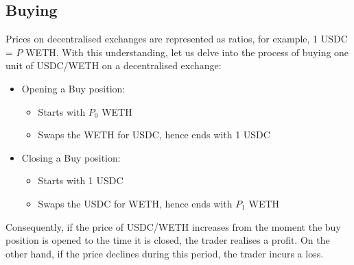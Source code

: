 \subsection{Buying}
Prices on decentralised exchanges are represented as ratios, for example, 1 USDC = $P$ WETH. With this understanding, let us delve into the process of buying one unit of USDC/WETH on a decentralised exchange:
\begin{itemize}
    \item Opening a Buy position:\begin{itemize}
        \item Starts with $P_{0}$ WETH
        \item Swaps the WETH for USDC, hence ends with 1 USDC
    \end{itemize}
    \item Closing a Buy position:\begin{itemize}
        \item Starts with 1 USDC
        \item Swaps the USDC for WETH, hence ends with $P_1$ WETH
    \end{itemize}
\end{itemize}
\noindent Consequently, if the price of USDC/WETH increases from the moment the buy position is opened to the time it is closed, the trader realises a profit. On the other hand, if the price declines during this period, the trader incurs a loss.

